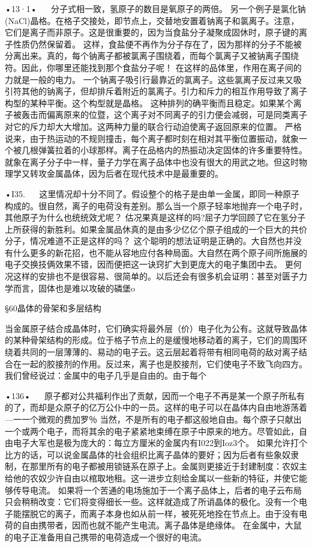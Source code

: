 •13·1•
  
分子式相一致，氢原子的数目是氧原子的两倍。
另一个例子是氯化钠(NaCl)晶格。在格子交接处，即节点上，交替地安置着钠离子和氯离子。注意，它们是离子而非原子。这是很重要的，因为当食盐分子凝聚成固休时，原子键的离子性质仍然保留着。
这样，食盐便不再作为分子存在了，因为那样的分子不能被分离出来。真的，每个钠离子都被氯离子围绕着，而每个氯离子又被钠离子围绕符。因此，你哪里还能找到那个食盐分子呢！
在这样的品体里，作用在离子间的力就是一般的电力。
一个钠离子吸引行最靠近的氯离子。这些氯离子反过来又吸引符其他的钠离子，但却排斥着附近的氯离子。引力和斥力的相互作用导致了离子构型的某种平衡。这个构型就是晶格。
这种排列的确平衡而且稳定。如果某个离子被轰击而偏离原来的位暨，这个离子对不同离子的引力便会减弱，可是同类离子对它的斥力却大大增加。这两种力量的联合行动迫使离子返回原来的位置。
严格说来，由于热运动的不规则撞击，每个离子都时刻在相对其平衡位置振动，就象一个被几根弹簧拉着的小球那样。离子在品格内的热振动决定固体的许多重要特性。
就象在离子分子中一样，量子力学在离子品体中也没有很大的用武之地。但这时物理学又转攻金属晶体，因为后者在现代技术中是最重要的。

•I35.
  
这里情况却十分不同了。假设整个的格子是由单一金属，即同一种原子构成的。很自然，离子的电荷没有差别。那么当一个原子轻率地抛弃一个电子时，其他原子为什么也统统效尤呢？
估况果真是这样的吗?屈子力学回顾了它在氢分子上所获得的新胜利。如果金属品休真的是由多少亿亿个原子组成的一个巨大的共价分子，情况难道不正是这样的吗？
这个聪明的想法证明是正确的。大自然也并没有什么更多的新花招，也不能从容地应付各种局面。大自然在两个原子间所施展的电子交换技俩效果不错，因而便把这一诀窍扩大到更庞大的电子集团中去。
更何况这样的安排也不是很容易、很简单的。以后还会有很多机会证明：甚至对匮子力学而言，固体也是难以攻破的磷堡o

§60晶体的骨架和多层结构

当金属原子结合成晶体时，它们确实将最外层（价）电子化为公有。这就导致晶体的某种骨架结构的形成。位于格子节点上的是缓慢地移动着的离子，它们的周围环绕着共同的一层薄薄的、易动的电子云。这云层起着将带有相同电荷的敌对离子结合在一起的胶接剂的作用。反过来，离子也是胶接剂，它们使电子不致飞向四方。
我们曾经说过：金属中的电子几乎是自由的。由于每个

•136•
  
原子都对公共福利作出了贡献，因而一个电子不再是某一个原子所私有的了，而却是众原子的亿万公仆中的一员。这样的电子可以在晶体内自由地游荡着—一一个微观的费加罗％
当然，不是所有的电子都这般地自由。每个原子只献出一个或两个电子，而将其余的电子紧紧地束缚在原子中原来的地方。尽管如此，自由电子大军也是极为庞大的：每立方厘米的金属内有I022到Ioz3个。
如果允许打个比方的话，可以说金属晶体的社会组织比离子晶体的要好；因为后者有些象奴隶制，在那里所有的电子都被用锁链系在原子上。金属则更接近于封建制度：农奴主给他的农奴少许自由以棺取地租。这一进步立刻给金属以一些新的特征，并使它能够传导电流。
如果将一个苦通的电场施加于一个离子品体上，后者的电子云布局只会稍稍改变：它们将变得细长一些。这样就造成了所诮晶体的极化。没有一个电子能摆脱它的离子，而离子本身也如从前一样，被死死地拴在节点上。由于没有电荷的自由携带者，因而也就不能产生电流。离子晶体是绝缘体。
在金属中，大鼠的电子正准备用自己携带的电荷造成一个很好的电流。

